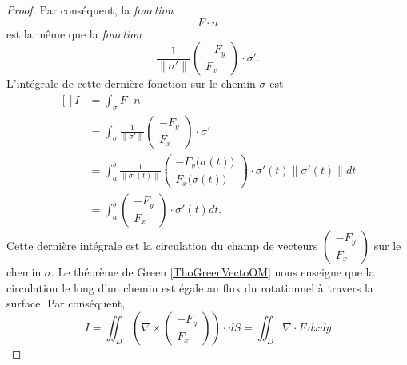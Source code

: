 \begin{proof}
    Par conséquent, la \emph{fonction}
    \begin{equation}
        F\cdot n
    \end{equation}
    est la même que la \emph{fonction} 
    \begin{equation}
        \frac{1}{ \| \sigma' \| }\begin{pmatrix}
            -F_y    \\ 
            F_x    
        \end{pmatrix}\cdot \sigma'.
    \end{equation}
    L'intégrale de cette dernière fonction sur le chemin $\sigma$ est 
    \begin{equation}
        \begin{aligned}[]
            I&=\int_{\sigma} F\cdot n\\
            &=\int_{\sigma}\frac{1}{ \| \sigma' \| }\begin{pmatrix}
                -F_y    \\ 
                F_x    
            \end{pmatrix}\cdot \sigma'\\
            &=  \int_a^b\frac{1}{ \| \sigma'(t)\| }\begin{pmatrix}
                -F_y\big( \sigma(t) \big)    \\ 
                F_x\big( \sigma(t) \big)
            \end{pmatrix}
            \cdot\sigma'(t)\| \sigma'(t) \|dt\\
            &=
            \int_a^b\begin{pmatrix}
                -F_y    \\ 
                F_x    
            \end{pmatrix}\cdot \sigma'(t)dt.
        \end{aligned}
    \end{equation}
    Cette dernière intégrale est la circulation du champ de vecteurs $\begin{pmatrix}
        -F_y    \\ 
        F_x    
    \end{pmatrix}$ sur le chemin $\sigma$. Le théorème de Green \ref{ThoGreenVectoOM} nous enseigne que la circulation le long d'un chemin est égale au flux du rotationnel à travers la surface. Par conséquent,
    \begin{equation}
        I=\iint_D\left( \nabla\times\begin{pmatrix}
            -F_y    \\ 
            F_x    
        \end{pmatrix}\right)\cdot dS=\iint_D\nabla\cdot F\, dxdy
    \end{equation}
    

\end{proof}

